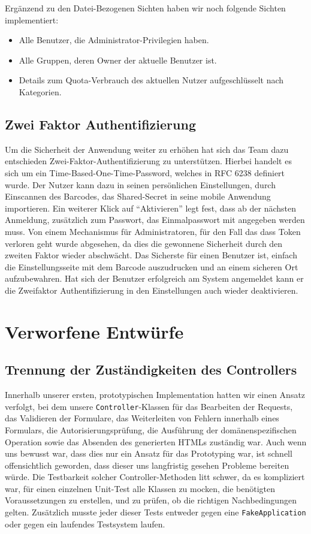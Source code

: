 \documentclass[12pt,DIV14,BCOR10mm,a4paper,parskip=half-,headsepline,headinclude,english,ngerman,bibliography=totocnumbered]{scrreprt}
\begin{document}
Ergänzend zu den Datei-Bezogenen Sichten haben wir noch folgende Sichten implementiert:

\begin{itemize}
	\item Alle Benutzer, die Administrator-Privilegien haben.
	\item Alle Gruppen, deren Owner der aktuelle Benutzer ist.
	\item Details zum Quota-Verbrauch des aktuellen Nutzer aufgeschlüsselt nach Kategorien.
\end{itemize}

\section{Zwei Faktor Authentifizierung}
Um die Sicherheit der Anwendung weiter zu erhöhen hat sich das Team dazu entschieden Zwei-Faktor-Authentifizierung zu unterstützen. Hierbei handelt es sich um ein Time-Based-One-Time-Password, welches in RFC 6238 \autocite{rfc6238} definiert wurde. Der Nutzer kann dazu in seinen persönlichen Einstellungen, durch Einscannen des Barcodes, das Shared-Secret in seine mobile Anwendung importieren. Ein weiterer Klick auf \enquote{Aktivieren} legt fest, dass ab der nächsten Anmeldung, zusätzlich zum Passwort, das Einmalpasswort mit angegeben werden muss. Von einem Mechanismus für Administratoren, für den Fall das dass Token verloren geht wurde abgesehen, da dies die gewonnene Sicherheit durch den zweiten Faktor wieder abschwächt. Das Sicherste für einen Benutzer ist, einfach die Einstellungsseite mit dem Barcode auszudrucken und an einem sicheren Ort aufzubewahren. Hat sich der Benutzer erfolgreich am System angemeldet kann er die Zweifaktor Authentifizierung in den Einstellungen auch wieder deaktivieren.

\chapter{Verworfene Entwürfe}

\section{Trennung der Zuständigkeiten des Controllers}
\label{architecture:manager-class-creation}

Innerhalb unserer ersten, prototypischen Implementation hatten wir einen Ansatz verfolgt, bei dem unsere \texttt{Controller}-Klassen für das Bearbeiten der Requests, das Validieren der Formulare, das Weiterleiten von Fehlern innerhalb eines Formulars, die Autorisierungsprüfung, die Ausführung der domänenspezifischen Operation sowie das Absenden des generierten HTMLs zuständig war.
Auch wenn uns bewusst war, dass dies nur ein Ansatz für das Prototyping war, ist schnell offensichtlich geworden, dass dieser uns langfristig gesehen Probleme bereiten würde.
Die Testbarkeit solcher Controller-Methoden litt schwer, da es kompliziert war, für einen einzelnen Unit-Test alle Klassen zu mocken, die benötigten Voraussetzungen zu erstellen, und zu prüfen, ob die richtigen Nachbedingungen gelten.
Zusätzlich musste jeder dieser Tests entweder gegen eine \texttt{FakeApplication} oder gegen ein laufendes Testsystem laufen.
\end{document}
